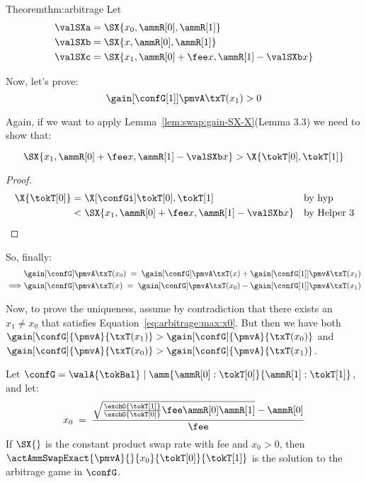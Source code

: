 \begin{proofof}{Theorem}{thm:arbitrage}
  Let 
  \begin{align*}
      \valSXa & = \SX{x_0,\ammR[0],\ammR[1]} 
      \\
      \valSXb & = \SX{x,\ammR[0],\ammR[1]}
      \\
      \valSXc & = \SX{x_1,\ammR[0] + \fee x,\ammR[1] - \valSXb x}
  \end{align*}

    Now, let's prove: 
    \begin{equation}
      \gain[{\confG[1]}]{\pmvA}{\txT(x_1)} > 0
    \end{equation}

    Again, if we want to apply Lemma~\ref{lem:swap:gain-SX-X}(Lemma 3.3) we need to show that: 

    \begin{equation}
      \SX{x_1, \ammR[0] + \fee x, \ammR[1] - \valSXb x} > \X{\tokT[0], \tokT[1]}
    \end{equation}

    \begin{proof}
        \begin{align*}
            \X{\tokT[0]} & = \X[{\confGi}]{\tokT[0], \tokT[1]} && \text{by hyp}
            \\
            & < \SX{x_1, \ammR[0] + \fee x, \ammR[1] - \valSXb x} && \text{by Helper 3}
        \end{align*}
    \end{proof}

    So, finally: 
    \begin{align*}
      & \gain[{\confG}]{\pmvA}{\txT(x_0)} \; = \; \gain[{\confG}]{\pmvA}{\txT(x)}
      +
      \gain[{\confG[1]}]{\pmvA}{\txT(x_1)}
      \\
      \implies & \gain[{\confG}]{\pmvA}{\txT(x)} \; = \; \gain[{\confG}]{\pmvA}{\txT(x_0)}
      -
      \gain[{\confG[1]}]{\pmvA}{\txT(x_1)}
    \end{align*}

    Now, to prove the uniqueness, assume by contradiction that there exists an $x_1 \neq x_0$ that satisfies Equation~\ref{eq:arbitrage:max:x0}. But then we have both $\gain[\confG]{\pmvA}{\txT(x_1)} > \gain[\confG]{\pmvA}{\txT(x_0)}$ and $\gain[\confG]{\pmvA}{\txT(x_0)} > \gain[\confG]{\pmvA}{\txT(x_1)}$.

\end{proofof}

\begin{lem}
  \label{lem:arbitrage:const-prod-fee}
  Let $\confG = \walA{\tokBal} \mid \amm{\ammR[0]:\tokT[0]}{\ammR[1]:\tokT[1]}$,
  and let:
  \begin{equation}
    \label{eq:arbitrage:const-prod}
    x_0 
    \; = \;
    \frac {\sqrt{\frac{\exchO{\tokT[1]}}{\exchO{\tokT[0]}} \fee \ammR[0] \ammR[1]} - \ammR[0]}
          {\fee}
  \end{equation}
  If $\SX{}$ is the constant product swap rate with fee and $x_0 > 0$,
  then $\actAmmSwapExact{\pmvA}{}{x_0}{\tokT[0]}{\tokT[1]}$
  is the solution to the arbitrage game in $\confG$.
\end{lem}


